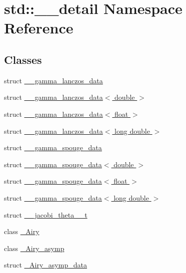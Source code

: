 \hypertarget{namespacestd_1_1____detail}{}\section{std\+:\+:\+\_\+\+\_\+detail Namespace Reference}
\label{namespacestd_1_1____detail}
\subsection*{Classes}
\begin{DoxyCompactItemize}
\item 
struct \hyperlink{structstd_1_1____detail_1_1____gamma__lanczos__data}{\+\_\+\+\_\+gamma\+\_\+lanczos\+\_\+data}
\item 
struct \hyperlink{structstd_1_1____detail_1_1____gamma__lanczos__data_3_01double_01_4}{\+\_\+\+\_\+gamma\+\_\+lanczos\+\_\+data$<$ double $>$}
\item 
struct \hyperlink{structstd_1_1____detail_1_1____gamma__lanczos__data_3_01float_01_4}{\+\_\+\+\_\+gamma\+\_\+lanczos\+\_\+data$<$ float $>$}
\item 
struct \hyperlink{structstd_1_1____detail_1_1____gamma__lanczos__data_3_01long_01double_01_4}{\+\_\+\+\_\+gamma\+\_\+lanczos\+\_\+data$<$ long double $>$}
\item 
struct \hyperlink{structstd_1_1____detail_1_1____gamma__spouge__data}{\+\_\+\+\_\+gamma\+\_\+spouge\+\_\+data}
\item 
struct \hyperlink{structstd_1_1____detail_1_1____gamma__spouge__data_3_01double_01_4}{\+\_\+\+\_\+gamma\+\_\+spouge\+\_\+data$<$ double $>$}
\item 
struct \hyperlink{structstd_1_1____detail_1_1____gamma__spouge__data_3_01float_01_4}{\+\_\+\+\_\+gamma\+\_\+spouge\+\_\+data$<$ float $>$}
\item 
struct \hyperlink{structstd_1_1____detail_1_1____gamma__spouge__data_3_01long_01double_01_4}{\+\_\+\+\_\+gamma\+\_\+spouge\+\_\+data$<$ long double $>$}
\item 
struct \hyperlink{structstd_1_1____detail_1_1____jacobi__theta__0__t}{\+\_\+\+\_\+jacobi\+\_\+theta\+\_\+\_\+t}
\item 
class \hyperlink{classstd_1_1____detail_1_1__Airy}{\+\_\+\+Airy}
\item 
class \hyperlink{classstd_1_1____detail_1_1__Airy__asymp}{\+\_\+\+Airy\+\_\+asymp}
\item 
struct \hyperlink{structstd_1_1____detail_1_1__Airy__asymp__data}{\+\_\+\+Airy\+\_\+asymp\+\_\+data}

\end{DoxyCompactItemize}
